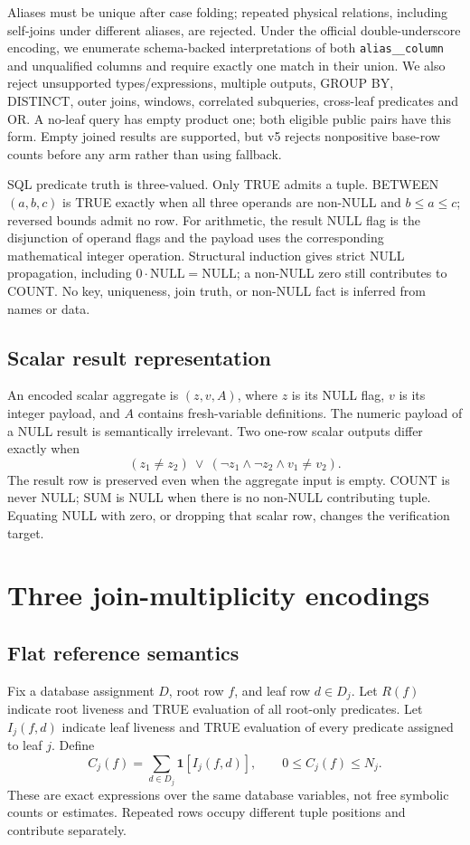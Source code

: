 \documentclass[3p,times,authoryear]{elsarticle}
\newcommand{\ind}[1]{\mathbf{1}[#1]}
\newcommand{\NULL}{\mathrm{NULL}}
\begin{document}
Aliases must be unique after case folding; repeated physical relations, including self-joins under different aliases, are rejected. Under the official double-underscore encoding, we enumerate schema-backed interpretations of both \texttt{alias\_\_column} and unqualified columns and require exactly one match in their union. We also reject unsupported types/expressions, multiple outputs, GROUP BY, DISTINCT, outer joins, windows, correlated subqueries, cross-leaf predicates and OR. A no-leaf query has empty product one; both eligible public pairs have this form. Empty joined results are supported, but v5 rejects nonpositive base-row counts before any arm rather than using fallback.

SQL predicate truth is three-valued. Only TRUE admits a tuple. BETWEEN$(a,b,c)$ is TRUE exactly when all three operands are non-NULL and $b\le a\le c$; reversed bounds admit no row. For arithmetic, the result NULL flag is the disjunction of operand flags and the payload uses the corresponding mathematical integer operation. Structural induction gives strict NULL propagation, including $0\cdot\NULL=\NULL$; a non-NULL zero still contributes to COUNT. No key, uniqueness, join truth, or non-NULL fact is inferred from names or data.

\subsection{Scalar result representation}
An encoded scalar aggregate is $(z,v,A)$, where $z$ is its NULL flag, $v$ is its integer payload, and $A$ contains fresh-variable definitions. The numeric payload of a NULL result is semantically irrelevant. Two one-row scalar outputs differ exactly when
\begin{equation}
 (z_1\ne z_2)\ \lor\ (\neg z_1\land\neg z_2\land v_1\ne v_2).
 \label{eq:neq}
\end{equation}
The result row is preserved even when the aggregate input is empty. COUNT is never NULL; SUM is NULL when there is no non-NULL contributing tuple. Equating NULL with zero, or dropping that scalar row, changes the verification target.

\section{Three join-multiplicity encodings}\label{sec:method}
\subsection{Flat reference semantics}
Fix a database assignment $D$, root row $f$, and leaf row $d\in D_j$. Let $R(f)$ indicate root liveness and TRUE evaluation of all root-only predicates. Let $I_j(f,d)$ indicate leaf liveness and TRUE evaluation of every predicate assigned to leaf $j$. Define
\begin{equation}
 C_j(f)=\sum_{d\in D_j}\ind{I_j(f,d)},\qquad 0\le C_j(f)\le N_j.
 \label{eq:counts}
\end{equation}
These are exact expressions over the same database variables, not free symbolic counts or estimates. Repeated rows occupy different tuple positions and contribute separately.
\end{document}
